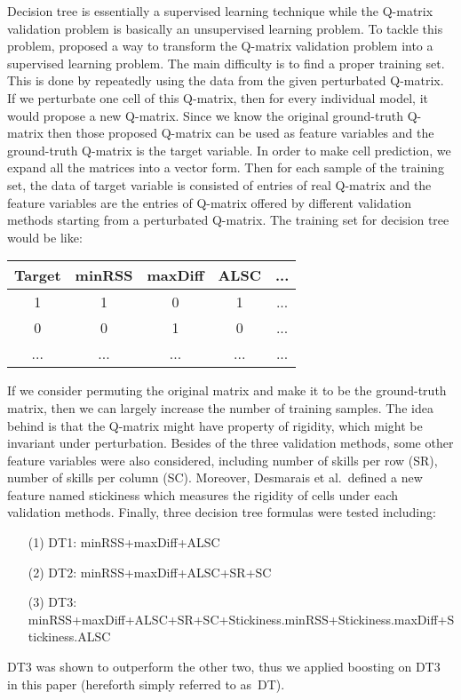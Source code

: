 \documentclass{edm_template}
\begin{document}
Decision tree is essentially a supervised learning technique while the Q-matrix validation problem is basically an unsupervised learning problem. To tackle this problem,  proposed a way to transform the Q-matrix validation problem into a supervised learning problem. The main difficulty is to find a proper training set. This is done by repeatedly using the data from the given perturbated Q-matrix. If we perturbate one cell of this Q-matrix, then for every individual model, it would propose a new Q-matrix. Since we know the original ground-truth Q-matrix then those proposed Q-matrix can be used as feature variables and the ground-truth Q-matrix is the target variable. In order to make cell prediction, we expand all the matrices into a vector form. Then for each sample of the training set, the data of target variable is consisted of entries of real Q-matrix and the feature variables are the entries of Q-matrix offered by different validation methods starting from a perturbated Q-matrix. The training set for decision tree would be like:
\begin{tabular}{ c| c c c c}
  Target & minRSS & maxDiff & ALSC &...\\
  \hline
  1 & 1 & 0 & 1 & ...\\
  0 & 0 & 1 & 0 & ...\\
  ... &... &... &... &...\\
\end{tabular}
If we consider permuting the original matrix and make it to be the ground-truth matrix, then we can largely increase the number of training samples. The idea behind is that the Q-matrix might have property of rigidity, which might be invariant under perturbation. Besides of the three validation methods, some other feature variables were also considered, including number of skills per row (SR), number of skills per column (SC). Moreover, Desmarais et al.\ defined a new feature named stickiness which measures the rigidity of cells under each validation methods. Finally, three decision tree formulas were tested including:
\begin{itemize}\raggedright
\item[(1)] DT1: minRSS+maxDiff+ALSC
\item[(2)] DT2: minRSS+maxDiff+ALSC+SR+SC
\item[(3)] DT3: minRSS+maxDiff+ALSC+SR+SC+\linebreak Stickiness.minRSS+Stickiness.maxDiff+\linebreak Stickiness.ALSC
\end{itemize}
DT3 was shown to outperform the other two, thus we applied boosting on DT3 in this paper (hereforth simply referred to as~DT).
\end{document}
